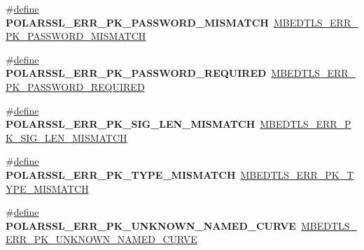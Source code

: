 \begin{DoxyCompactItemize}
\item 
\mbox{\label{compat-1_83_8h_a8fade72c0a20c8d5f13ce3a209db58ca}} 
\#\hyperlink{structdefine}{define} {\bfseries P\+O\+L\+A\+R\+S\+S\+L\+\_\+\+E\+R\+R\+\_\+\+P\+K\+\_\+\+P\+A\+S\+S\+W\+O\+R\+D\+\_\+\+M\+I\+S\+M\+A\+T\+CH}~\hyperlink{pk_8h_a24723299c688b1ca6cfa613c19cef6f5}{M\+B\+E\+D\+T\+L\+S\+\_\+\+E\+R\+R\+\_\+\+P\+K\+\_\+\+P\+A\+S\+S\+W\+O\+R\+D\+\_\+\+M\+I\+S\+M\+A\+T\+CH}
\item 
\mbox{\label{compat-1_83_8h_a420e18624ba63e48d18c4e647a199904}} 
\#\hyperlink{structdefine}{define} {\bfseries P\+O\+L\+A\+R\+S\+S\+L\+\_\+\+E\+R\+R\+\_\+\+P\+K\+\_\+\+P\+A\+S\+S\+W\+O\+R\+D\+\_\+\+R\+E\+Q\+U\+I\+R\+ED}~\hyperlink{pk_8h_a9c1de7ccb4e18a3ea74b35c4e2cb7527}{M\+B\+E\+D\+T\+L\+S\+\_\+\+E\+R\+R\+\_\+\+P\+K\+\_\+\+P\+A\+S\+S\+W\+O\+R\+D\+\_\+\+R\+E\+Q\+U\+I\+R\+ED}
\item 
\mbox{\label{compat-1_83_8h_a455daffab2c5f217faf4e65c26a8c505}} 
\#\hyperlink{structdefine}{define} {\bfseries P\+O\+L\+A\+R\+S\+S\+L\+\_\+\+E\+R\+R\+\_\+\+P\+K\+\_\+\+S\+I\+G\+\_\+\+L\+E\+N\+\_\+\+M\+I\+S\+M\+A\+T\+CH}~\hyperlink{pk_8h_abce78b0c7f04018824b70b816e091dc0}{M\+B\+E\+D\+T\+L\+S\+\_\+\+E\+R\+R\+\_\+\+P\+K\+\_\+\+S\+I\+G\+\_\+\+L\+E\+N\+\_\+\+M\+I\+S\+M\+A\+T\+CH}
\item 
\mbox{\label{compat-1_83_8h_adfc2587a1c20023c21a1121d3a396d2f}} 
\#\hyperlink{structdefine}{define} {\bfseries P\+O\+L\+A\+R\+S\+S\+L\+\_\+\+E\+R\+R\+\_\+\+P\+K\+\_\+\+T\+Y\+P\+E\+\_\+\+M\+I\+S\+M\+A\+T\+CH}~\hyperlink{pk_8h_a7a7fb7cb156476722c09de42368156dc}{M\+B\+E\+D\+T\+L\+S\+\_\+\+E\+R\+R\+\_\+\+P\+K\+\_\+\+T\+Y\+P\+E\+\_\+\+M\+I\+S\+M\+A\+T\+CH}
\item 
\mbox{\label{compat-1_83_8h_a0c3ac0ce0bef7a1903bdb98fce9b5e6e}} 
\#\hyperlink{structdefine}{define} {\bfseries P\+O\+L\+A\+R\+S\+S\+L\+\_\+\+E\+R\+R\+\_\+\+P\+K\+\_\+\+U\+N\+K\+N\+O\+W\+N\+\_\+\+N\+A\+M\+E\+D\+\_\+\+C\+U\+R\+VE}~\hyperlink{pk_8h_a802d8b95e9b6a517d597dc92cb591e99}{M\+B\+E\+D\+T\+L\+S\+\_\+\+E\+R\+R\+\_\+\+P\+K\+\_\+\+U\+N\+K\+N\+O\+W\+N\+\_\+\+N\+A\+M\+E\+D\+\_\+\+C\+U\+R\+VE}
\item 
\mbox{\label{compat-1_83_8h_a84d3aa6334f5ad3d67dee14c76017354}} 

\end{DoxyCompactItemize}
